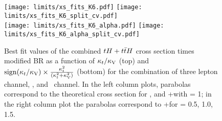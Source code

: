 \begin{figure} [!h]
 \centering
 \texttt{[image: limits/xs\_fits\_K6.pdf]}
 \texttt{[image: limits/xs\_fits\_K6\_split\_cv.pdf]}\\
 \texttt{[image: limits/xs\_fits\_K6\_alpha.pdf]}
 \texttt{[image: limits/xs\_fits\_K6\_alpha\_split\_cv.pdf]}
\caption[Best fit values of the combined $\tH+\ttH$ $\sigma\times$BR]{Best fit values of the combined $\tH+\ttH$ cross section times modified BR as a function of $\kappa_t/\kappa_\text{V}$ (top) and $\mathrm{sign}(\kappa_t/\kappa_\text{V})\times\frac{\kappa_t^2}{(\kappa_t^2+\kappa_\text{V}^2)}$ (bottom) for the combination of three lepton channel, \mumu, and \emu\ channel. In the left column plots, parabolas correspond to the theoretical cross section for \tH, \ttH and \th+\ttH with \CV= 1; in the right column plot the parabolas correspond to \tH+\ttH for \CV= 0.5, 1.0, 1.5.}
\label{fig:xs_fits_cv}
\end{figure}




